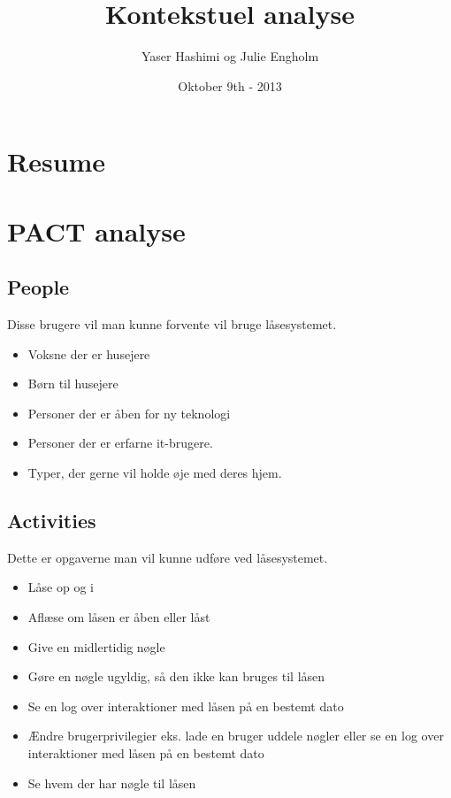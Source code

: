 \documentclass[a4paper,12pt]{article}
\title{Kontekstuel analyse}
\author{Yaser Hashimi og Julie Engholm}
\date{Oktober 9th - 2013}
\begin{document}
\maketitle %
\newpage
\section*{Resume}
\newpage
\tableofcontents %
\newpage

\clearpage %

\section{PACT analyse}
\subsection{People}
Disse brugere vil man kunne forvente vil bruge låsesystemet.

\begin{itemize}
    \item Voksne der er husejere
    \item Børn til husejere
    \item Personer der er åben for ny teknologi
    \item Personer der er erfarne it-brugere.
    \item Typer, der gerne vil holde øje med deres hjem.
\end{itemize}

\subsection{Activities}
Dette er opgaverne man vil kunne udføre ved låsesystemet.

\begin{itemize}
    \item Låse op og i
    \item Aflæse om låsen er åben eller låst
    \item Give en midlertidig nøgle
    \item Gøre en nøgle ugyldig, så den ikke kan bruges til låsen
    \item Se en log over interaktioner med låsen på en bestemt dato
    \item Ændre brugerprivilegier eks. lade en bruger uddele nøgler eller se en log over interaktioner med låsen på en bestemt dato
    \item Se hvem der har nøgle til låsen
\end{itemize}
\end{document}
